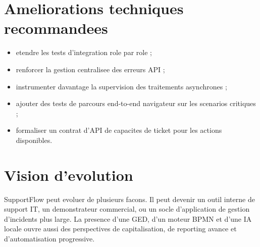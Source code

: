 \section{Ameliorations techniques recommandees}

\begin{itemize}[leftmargin=1.2cm]
  \item etendre les tests d'integration role par role ;
  \item renforcer la gestion centralisee des erreurs API ;
  \item instrumenter davantage la supervision des traitements asynchrones ;
  \item ajouter des tests de parcours end-to-end navigateur sur les scenarios critiques ;
  \item formaliser un contrat d'API de capacites de ticket pour les actions disponibles.
\end{itemize}

\section{Vision d'evolution}

SupportFlow peut evoluer de plusieurs facons. Il peut devenir un outil interne de support IT, un demonstrateur commercial, ou un socle d'application de gestion d'incidents plus large. La presence d'une GED, d'un moteur BPMN et d'une IA locale ouvre aussi des perspectives de capitalisation, de reporting avance et d'automatisation progressive.


